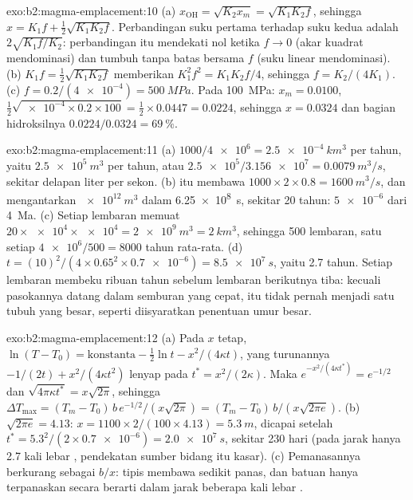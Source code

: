 \begin{solution}{exo:b2:magma-emplacement:10}
(a) $x_{\mathrm{OH}} = \sqrt{K_2x_m} = \sqrt{K_1K_2f}$, sehingga $x = K_1f + \frac12\sqrt{K_1K_2f}$.
Perbandingan suku pertama terhadap suku kedua adalah $2\sqrt{K_1f/K_2}$: perbandingan itu mendekati nol
ketika $f \to 0$ (akar kuadrat mendominasi) dan tumbuh tanpa batas bersama $f$ (suku
linear mendominasi). (b) $K_1 f = \frac12\sqrt{K_1K_2 f}$ memberikan $K_1^2f^2 =
K_1K_2f/4$, sehingga $f = K_2/(4K_1)$. (c) $f = 0.2/(\num{4e-4}) = \qty{500}{MPa}$. Pada
\qty{100}{MPa}: $x_m = 0.0100$, $\frac12\sqrt{\num{e-4}\times0.2\times100} =
\frac12\times0.0447 = 0.0224$, sehingga $x = 0.0324$ dan bagian hidroksilnya
$0.0224/0.0324 = \qty{69}{\percent}$.
\end{solution}

\begin{solution}{exo:b2:magma-emplacement:11}
(a) $1000/\num{4e6} = \qty{2.5e-4}{km^3}$ per tahun, yaitu $\qty{2.5e5}{m^3}$ per tahun,
atau $\num{2.5e5}/\num{3.156e7} = \qty{0.0079}{m^3/s}$, sekitar delapan liter per sekon.
(b)  itu membawa $1000\times2\times0.8 = \qty{1600}{m^3/s}$, dan mengantarkan
$\qty{e12}{m^3}$ dalam \qty{6.25e8}{s}, sekitar 20 tahun: $\num{5e-6}$ dari
\qty{4}{Ma}. (c) Setiap lembaran memuat $20\times\num{e4}\times\num{e4} = \qty{2e9}{m^3} =
\qty{2}{km^3}$, sehingga 500 lembaran, satu setiap $\num{4e6}/500 = 8000$ tahun rata-rata.
(d) $t = (10)^2/(4\times0.65^2\times\num{0.7e-6}) = \qty{8.5e7}{s}$, yaitu 2.7 tahun. Setiap
lembaran membeku ribuan tahun sebelum lembaran berikutnya tiba: kecuali pasokannya
datang dalam semburan yang cepat,  itu tidak pernah menjadi satu tubuh  yang besar, seperti
diisyaratkan penentuan umur  besar.
\end{solution}

\begin{solution}{exo:b2:magma-emplacement:12}
(a) Pada $x$ tetap, $\ln(T - T_0) = \text{konstanta} - \frac12\ln t - x^2/(4\kappa t)$, yang
turunannya $-1/(2t) + x^2/(4\kappa t^2)$ lenyap pada $t^* = x^2/(2\kappa)$. Maka
$e^{-x^2/(4\kappa t^*)} = e^{-1/2}$ dan $\sqrt{4\pi\kappa t^*} = x\sqrt{2\pi}$, sehingga $\Delta
T_{\max} = (T_m - T_0)\,b\,e^{-1/2}/(x\sqrt{2\pi}) = (T_m - T_0)\,b/(x\sqrt{2\pi e})$. (b)
$\sqrt{2\pi e} = 4.13$: $x = 1100\times2/(100\times4.13) = \qty{5.3}{m}$, dicapai setelah
$t^* = 5.3^2/(2\times\num{0.7e-6}) = \qty{2.0e7}{s}$, sekitar 230 hari (pada jarak hanya 2.7
kali lebar , pendekatan sumber bidang itu kasar). (c) Pemanasannya berkurang
sebagai $b/x$:  tipis membawa sedikit panas, dan batuan hanya terpanaskan secara berarti
dalam jarak beberapa kali lebar .
\end{solution}

